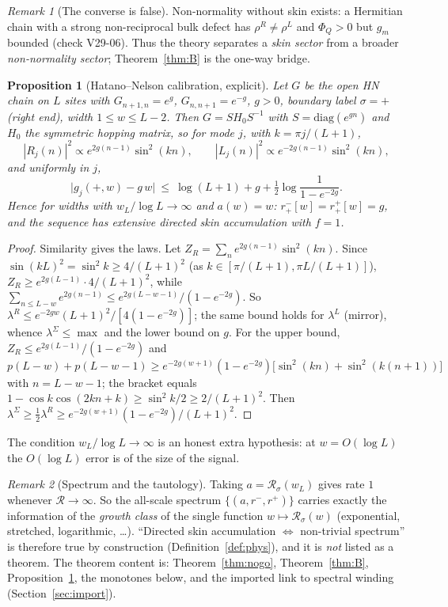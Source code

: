\documentclass[11pt]{article}
\newtheorem{proposition}[theorem]{Proposition}
\theoremstyle{definition}
\theoremstyle{remark}
\newtheorem{remark}{Remark}
\begin{document}
\begin{remark}[The converse is false]
Non-normality without skin exists: a Hermitian chain with a strong non-reciprocal bulk defect has $\rho^R\neq\rho^L$ and $\Phi_Q>0$ but $g_m$ bounded (check V29-06). Thus the theory separates a \emph{skin sector} from a broader \emph{non-normality sector}; Theorem~\ref{thm:B} is the one-way bridge.
\end{remark}

\begin{proposition}[Hatano--Nelson calibration, explicit]\label{prop:HN}
Let $G$ be the open HN chain on $L$ sites with $G_{n+1,n}=e^{g}$, $G_{n,n+1}=e^{-g}$, $g>0$, boundary label $\sigma=+$ (right end), width $1\le w\le L-2$. Then $G=SH_0S^{-1}$ with $S=\mathrm{diag}(e^{gn})$ and $H_0$ the symmetric hopping matrix, so for mode $j$, with $k=\pi j/(L+1)$,
\[
|R_j(n)|^2\propto e^{2g(n-1)}\sin^2(kn),\qquad |L_j(n)|^2\propto e^{-2g(n-1)}\sin^2(kn),
\]
and uniformly in $j$,
\[
\bigl|g_j(+,w)-g\,w\bigr|\ \le\ \log(L+1)+g+\tfrac12\log\frac1{1-e^{-2g}}.
\]
Hence for widths with $w_L/\log L\to\infty$ and $a(w)=w$: $r^-_+[w]=r^+_+[w]=g$, and the sequence has extensive directed skin accumulation with $f=1$.
\end{proposition}
\begin{proof}
Similarity gives the laws. Let $Z_R=\sum_ne^{2g(n-1)}\sin^2(kn)$. Since $\sin(kL)^2=\sin^2k\ge4/(L+1)^2$ (as $k\in[\pi/(L+1),\pi L/(L+1)]$), $Z_R\ge e^{2g(L-1)}\cdot4/(L+1)^2$, while $\sum_{n\le L-w}e^{2g(n-1)}\le e^{2g(L-w-1)}/(1-e^{-2g})$. So $\lambda^R\le e^{-2gw}(L+1)^2/[4(1-e^{-2g})]$; the same bound holds for $\lambda^L$ (mirror), whence $\lambda^\Sigma\le\max$ and the lower bound on $g$. For the upper bound, $Z_R\le e^{2g(L-1)}/(1-e^{-2g})$ and
$p(L-w)+p(L-w-1)\ge e^{-2g(w+1)}(1-e^{-2g})\bigl[\sin^2(kn)+\sin^2(k(n+1))\bigr]$ with $n=L-w-1$; the bracket equals $1-\cos k\cos(2kn+k)\ge\sin^2k/2\ge2/(L+1)^2$. Then $\lambda^\Sigma\ge\tfrac12\lambda^R\ge e^{-2g(w+1)}(1-e^{-2g})/(L+1)^2$.
\end{proof}
\noindent The condition $w_L/\log L\to\infty$ is an honest extra hypothesis: at $w=O(\log L)$ the $O(\log L)$ error is of the size of the signal.

\begin{remark}[Spectrum and the tautology]\label{rem:tauto}
Taking $a=\mathcal R_\sigma(w_L)$ gives rate $1$ whenever $\mathcal R\to\infty$. So the all-scale spectrum $\{(a,r^-,r^+)\}$ carries exactly the information of the \emph{growth class} of the single function $w\mapsto\mathcal R_\sigma(w)$ (exponential, stretched, logarithmic, \dots). ``Directed skin accumulation $\Leftrightarrow$ non-trivial spectrum'' is therefore true by construction (Definition~\ref{def:phys}), and it is \emph{not} listed as a theorem. The theorem content is: Theorem~\ref{thm:nogo}, Theorem~\ref{thm:B}, Proposition~\ref{prop:HN}, the monotones below, and the imported link to spectral winding (Section~\ref{sec:import}).
\end{remark}
\end{document}
